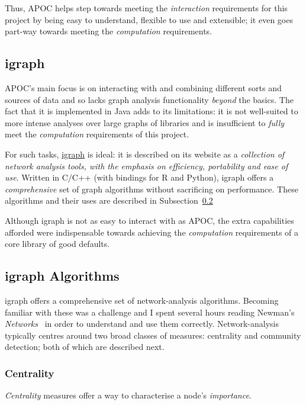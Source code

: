 Thus, APOC helps step towards meeting the \emph{interaction} requirements for
this project by being easy to understand, flexible to use and extensible; it
even goes part-way towards meeting the \emph{computation} requirements.

\subsection{igraph}\label{subsubsec:neo4jtoolsigraph}

APOC's main focus is on interacting with and combining different sorts and
sources of data and so lacks graph analysis functionality \emph{beyond} the
basics. The fact that it is implemented in Java adds to its limitations: it is
not well-suited to more intense analyses over large graphs of libraries and is
insufficient to \emph{fully} meet the \emph{computation} requirements of this
project.

For such tasks, \href{http://www.igraph.org}{igraph} is ideal: it is described
on its website as a \emph{collection of network analysis tools, with the
emphasis on efficiency, portability and ease of use}. Written in C/C++ (with
bindings for R and Python), igraph offers a \emph{comprehensive} set of graph
algorithms without sacrificing on performance. These algorithms and their uses
are described in Subsection~\ref{subsec:igraphalg}

Although igraph is not as easy to interact with  as APOC, the extra capabilities
afforded were indispensable towards achieving the \emph{computation}
requirements of a core library of good defaults.

\subsection{igraph Algorithms}\label{subsec:igraphalg}

igraph offers a comprehensive set of network-analysis algorithms. Becoming
familiar with these was a challenge and I spent several hours reading Newman's
\emph{Networks}~\cite{newman2008} in order to understand and use them correctly.
Network-analysis typically centres around two broad classes of measures:
centrality and community detection; both of which are described next.

\subsubsection{Centrality}

\emph{Centrality} measures offer a way to characterise a node's \emph{importance}.

